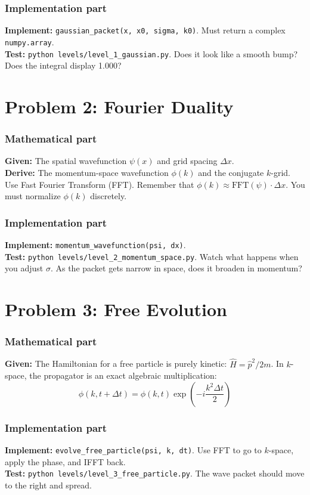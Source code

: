 \documentclass[11pt]{article}
\begin{document}
\subsubsection*{Implementation part}
\textbf{Implement:} \lstinline|gaussian_packet(x, x0, sigma, k0)|. Must return a complex \lstinline|numpy.array|. \\
\textbf{Test:} \lstinline|python levels/level_1_gaussian.py|. Does it look like a smooth bump? Does the integral display 1.000?


\section*{Problem 2: Fourier Duality}

\subsubsection*{Mathematical part}
\textbf{Given:} The spatial wavefunction $\psi(x)$ and grid spacing $\Delta x$. \\
\textbf{Derive:} The momentum-space wavefunction $\phi(k)$ and the conjugate $k$-grid. Use Fast Fourier Transform (FFT). Remember that $\phi(k) \approx \text{FFT}(\psi) \cdot \Delta x$. You must normalize $\phi(k)$ discretely.

\subsubsection*{Implementation part}
\textbf{Implement:} \lstinline|momentum_wavefunction(psi, dx)|. \\
\textbf{Test:} \lstinline|python levels/level_2_momentum_space.py|. Watch what happens when you adjust $\sigma$. As the packet gets narrow in space, does it broaden in momentum?


\section*{Problem 3: Free Evolution}

\subsubsection*{Mathematical part}
\textbf{Given:} The Hamiltonian for a free particle is purely kinetic: $\hat{H} = \hat{p}^2 / 2m$. In $k$-space, the propagator is an exact algebraic multiplication:
$$ \phi(k, t+\Delta t) = \phi(k, t) \exp\left(-i \frac{k^2 \Delta t}{2}\right) $$

\subsubsection*{Implementation part}
\textbf{Implement:} \lstinline|evolve_free_particle(psi, k, dt)|. Use FFT to go to $k$-space, apply the phase, and IFFT back. \\
\textbf{Test:} \lstinline|python levels/level_3_free_particle.py|. The wave packet should move to the right and spread.
\end{document}
